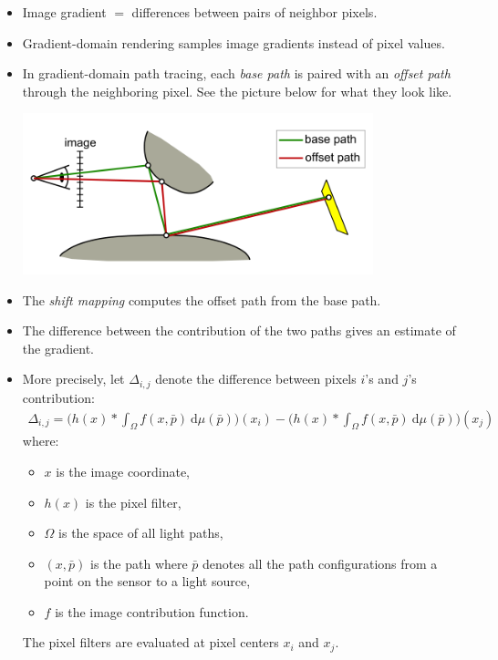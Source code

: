 \documentclass[10pt]{article}
\newcommand{\dee}{\mathrm{d}}
\begin{document}
  \begin{itemize}
  	\item Image gradient $=$ differences between pairs of neighbor pixels.

  	\item Gradient-domain rendering samples image gradients instead of pixel values.

  	\item In gradient-domain path tracing, each \emph{base path} is paired with an \emph{offset path} through the neighboring pixel.  See the picture below for what they look like.
  	\begin{center}
  		\includegraphics[width=4in]{base-offset.png}
  	\end{center}

  	\item The \emph{shift mapping} computes the offset path from the base path.

  	\item The difference between the contribution of the two paths gives an estimate of the gradient.

  	\item More precisely, let $\Delta_{i,j}$ denote the difference between pixels $i$'s and $j$'s contribution:
  	\begin{align*}
  		\Delta_{i,j} = \bigg( h(x) * \int_{\Omega} f(x, \bar p)\ \dee\mu(\bar p) \bigg)(x_i) - 
  		\bigg( h(x) * \int_{\Omega} f(x, \bar p)\ \dee\mu(\bar p) \bigg)(x_j)
  	\end{align*}
  	where:
  	\begin{itemize}
  		\item $x$ is the image coordinate,
  		\item $h(x)$ is the pixel filter,
  		\item $\Omega$ is the space of all light paths,
  		\item $(x, \bar p)$ is the path where $\bar p$ denotes all the path configurations from a point on the sensor to a light source,
  		\item $f$ is the image contribution function.
  	\end{itemize}
  	The pixel filters are evaluated at pixel centers $x_i$ and $x_j$.


\end{itemize}
\end{document}
